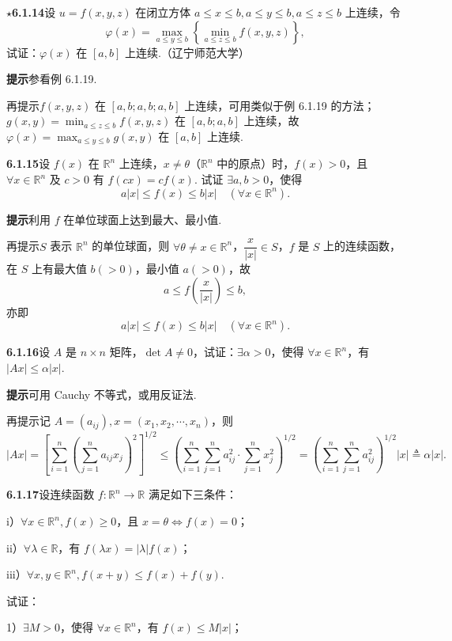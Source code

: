 \documentclass[UTF8, 12pt, fontset=fandol, oneside]{ctexart}
\begin{document}
\noindent\textbf{$\star$6.1.14}\quad 设 $u=f(x,y,z)$ 在闭立方体 $a\le x\le b,a\le y\le b,a\le z\le b$ 上连续，令
\[
  \varphi(x)=\max_{a\le y\le b}\left\{\min_{a\le z\le b}f(x,y,z)\right\},
\]
试证：$\varphi(x)$ 在 $[a,b]$ 上连续.（辽宁师范大学）

\noindent\textbf{提示}\quad 参看例 6.1.19.

再提示\quad $f(x,y,z)$ 在 $[a,b;a,b;a,b]$ 上连续，可用类似于例 6.1.19 的方法；$g(x,y)=\displaystyle\min_{a\le z\le b}f(x,y,z)$ 在 $[a,b;a,b]$ 上连续，故 $\varphi(x)=\displaystyle\max_{a\le y\le b}g(x,y)$ 在 $[a,b]$ 上连续.

\noindent\textbf{6.1.15}\quad 设 $f(x)$ 在 $\mathbb{R}^n$ 上连续，$x\ne\theta$（$\mathbb{R}^n$ 中的原点）时，$f(x)>0$，且 $\forall x\in\mathbb{R}^n$ 及 $c>0$ 有 $f(cx)=cf(x)$. 试证 $\exists a,b>0$，使得
\[
  a|x|\le f(x)\le b|x|\quad(\forall x\in\mathbb{R}^n).
\]

\noindent\textbf{提示}\quad 利用 $f$ 在单位球面上达到最大、最小值.

再提示\quad $S$ 表示 $\mathbb{R}^n$ 的单位球面，则 $\forall\theta\ne x\in\mathbb{R}^n$，$\dfrac{x}{|x|}\in S$，$f$ 是 $S$ 上的连续函数，在 $S$ 上有最大值 $b(>0)$，最小值 $a(>0)$，故
\[
  a\le f\left(\frac{x}{|x|}\right)\le b,
\]
亦即
\[
  a|x|\le f(x)\le b|x|\quad(\forall x\in\mathbb{R}^n).
\]

\noindent\textbf{6.1.16}\quad 设 $A$ 是 $n\times n$ 矩阵，$\det A\ne0$，试证：$\exists\alpha>0$，使得 $\forall x\in\mathbb{R}^n$，有 $|Ax|\le \alpha|x|$.

\noindent\textbf{提示}\quad 可用 Cauchy 不等式，或用反证法.

再提示\quad 记 $A=(a_{ij}),x=(x_1,x_2,\cdots,x_n)$，则
\[
  |Ax|=\left[\sum_{i=1}^n\left(\sum_{j=1}^n a_{ij}x_j\right)^2\right]^{1/2}
  \le \left(\sum_{i=1}^n\sum_{j=1}^n a_{ij}^2\cdot\sum_{j=1}^n x_j^2\right)^{1/2}
  =\left(\sum_{i=1}^n\sum_{j=1}^n a_{ij}^2\right)^{1/2}|x|\triangleq\alpha|x|.
\]

\noindent\textbf{6.1.17}\quad 设连续函数 $f:\mathbb{R}^n\to\mathbb{R}$ 满足如下三条件：

i）$\forall x\in\mathbb{R}^n,f(x)\ge0$，且 $x=\theta\Leftrightarrow f(x)=0$；

ii）$\forall\lambda\in\mathbb{R}$，有 $f(\lambda x)=|\lambda|f(x)$；

iii）$\forall x,y\in\mathbb{R}^n,f(x+y)\le f(x)+f(y)$.

试证：

1）$\exists M>0$，使得 $\forall x\in\mathbb{R}^n$，有 $f(x)\le M|x|$；
\end{document}
